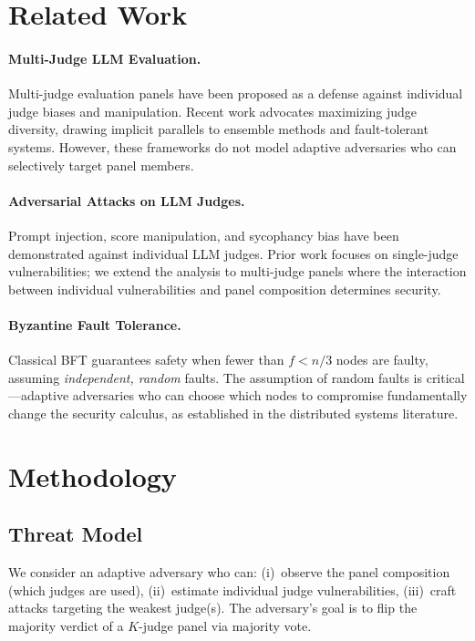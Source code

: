 \documentclass[11pt,a4paper]{article}
\begin{document}
\section{Related Work}

\paragraph{Multi-Judge LLM Evaluation.} Multi-judge evaluation panels have been proposed as a defense against individual judge biases and manipulation. Recent work advocates maximizing judge diversity, drawing implicit parallels to ensemble methods and fault-tolerant systems. However, these frameworks do not model adaptive adversaries who can selectively target panel members.

\paragraph{Adversarial Attacks on LLM Judges.} Prompt injection, score manipulation, and sycophancy bias have been demonstrated against individual LLM judges. Prior work focuses on single-judge vulnerabilities; we extend the analysis to multi-judge panels where the interaction between individual vulnerabilities and panel composition determines security.

\paragraph{Byzantine Fault Tolerance.} Classical BFT guarantees safety when fewer than $f < n/3$ nodes are faulty, assuming \emph{independent, random} faults. The assumption of random faults is critical---adaptive adversaries who can choose which nodes to compromise fundamentally change the security calculus, as established in the distributed systems literature.

\section{Methodology}

\subsection{Threat Model}

We consider an adaptive adversary who can:
(i)~observe the panel composition (which judges are used),
(ii)~estimate individual judge vulnerabilities,
(iii)~craft attacks targeting the weakest judge(s).
The adversary's goal is to flip the majority verdict of a $K$-judge panel via majority vote.
\end{document}
